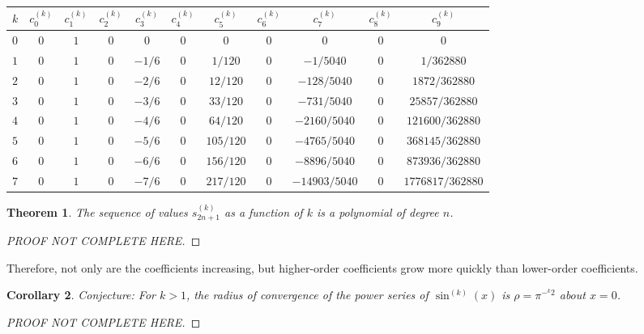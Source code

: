 \documentclass{article}
\newtheorem{theorem}{Theorem}
\newtheorem{corollary}[theorem]{Corollary}
\begin{document}
    \begin{table}[h]
    \centering
    \begin{tabular}{@{}l|cccccccccc@{}}
    $k$ & $c_{0}^{(k)}$ & $c_{1}^{(k)}$ & $c_{2}^{(k)}$ & $c_{3}^{(k)}$ & $c_{4}^{(k)}$ & $c_{5}^{(k)}$ & $c_{6}^{(k)}$ & $c_{7}^{(k)}$ & $c_{8}^{(k)}$ & $c_{9}^{(k)}$ \\ \midrule
    $0$ & $0$ & $1$ & $0$ & $0$    & $0$ & $0$       & $0$ & $0$           & $0$ & $0$              \\
    $1$ & $0$ & $1$ & $0$ & $-1/6$ & $0$ & $1/120$   & $0$ & $-1/5040$     & $0$ & $1/362880$       \\
    $2$ & $0$ & $1$ & $0$ & $-2/6$ & $0$ & $12/120$  & $0$ & $-128/5040$   & $0$ & $1872/362880$    \\
    $3$ & $0$ & $1$ & $0$ & $-3/6$ & $0$ & $33/120$  & $0$ & $-731/5040$   & $0$ & $25857/362880$   \\
    $4$ & $0$ & $1$ & $0$ & $-4/6$ & $0$ & $64/120$  & $0$ & $-2160/5040$  & $0$ & $121600/362880$  \\
    $5$ & $0$ & $1$ & $0$ & $-5/6$ & $0$ & $105/120$ & $0$ & $-4765/5040$  & $0$ & $368145/362880$  \\
    $6$ & $0$ & $1$ & $0$ & $-6/6$ & $0$ & $156/120$ & $0$ & $-8896/5040$  & $0$ & $873936/362880$  \\
    $7$ & $0$ & $1$ & $0$ & $-7/6$ & $0$ & $217/120$ & $0$ & $-14903/5040$ & $0$ & $1776817/362880$ \\
    \end{tabular}
    \end{table}

    \begin{theorem}
        The sequence of values $s_{2n+1}^{(k)}$ as a function of $k$ is a polynomial of degree $n$.
    \end{theorem}
    \begin{proof}
        [PROOF NOT COMPLETE HERE]
    \end{proof}

    Therefore, not only are the coefficients increasing, but higher-order coefficients grow more quickly than lower-order coefficients.

    \begin{corollary}
        Conjecture: For $k > 1$, the radius of convergence of the power series of $\sin^{(k)}(x)$ is $\rho = \pi^{-^{k}2}$ about $x = 0$.
    \end{corollary}
    \begin{proof}
        [PROOF NOT COMPLETE HERE]
    \end{proof}
\end{document}
